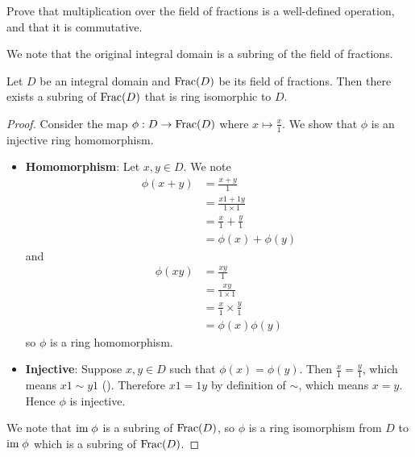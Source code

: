 \begin{exercise}\label{exercise-multiplication-over-field-of-fractions-is-well-defined-and-commutative}
    Prove that multiplication over the field of fractions is a well-defined operation, and that it is commutative.
\end{exercise}

We note that the original integral domain is a subring of the field of fractions.

\begin{theorem}
    Let $D$ be an integral domain and $\mathrm{Frac}(D)$ be its field of fractions. Then there exists a subring of $\mathrm{Frac}(D)$ that is ring isomorphic to $D$.
\end{theorem}
\begin{proof}
    Consider the map $\phi: D \to \mathrm{Frac}(D)$ where $x \mapsto \frac x1$. We show that $\phi$ is an injective ring homomorphism.
    \begin{itemize}
        \item \textbf{Homomorphism}: Let $x, y \in D$. We note
        \begin{align*}
            \phi(x + y) &= \frac{x+y}{1}\\
            &= \frac{x1 + 1y}{1 \times 1}\\
            &= \frac x1 + \frac y1\\
            &= \phi(x) + \phi(y)
        \end{align*}
        and
        \begin{align*}
            \phi(xy) &= \frac{xy}1\\
            &= \frac{xy}{1 \times 1}\\
            &= \frac x1 \times \frac y1\\
            &= \phi(x)\phi(y)
        \end{align*}
        so $\phi$ is a ring homomorphism.
        
        \item \textbf{Injective}: Suppose $x, y \in D$ such that $\phi(x) = \phi(y)$. Then $\frac x1 = \frac y1$, which means $x1 \mathrel{\sim} y1$ (). Therefore $x1 = 1y$ by definition of $\sim$, which means $x = y$. Hence $\phi$ is injective.
    \end{itemize}
    We note that $\mathrm{im}\; \phi$ is a subring of $\mathrm{Frac}(D)$, so $\phi$ is a ring isomorphism from $D$ to $\mathrm{im}\; \phi$ which is a subring of $\mathrm{Frac}(D)$.
\end{proof}

